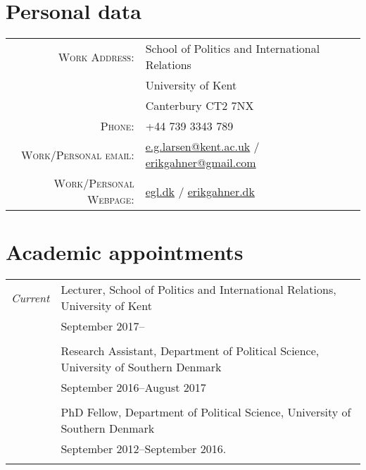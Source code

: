 \documentclass[a4paper,10pt]{article}
\begin{document}

\par{\bigskip\par}

\section{Personal data}
\begin{minipage}{0.4\textwidth}
\begin{tabular}{rl}
\textsc{Work Address:} & School of Politics and International Relations \\
& University of Kent \\
& Canterbury CT2 7NX \\
\textsc{Phone:} & +44 739 3343 789\\
\textsc{Work/Personal email:} & \href{mailto:e.g.larsen@kent.ac.uk}{e.g.larsen@kent.ac.uk} / \href{mailto:erikgahner@gmail.com}{erikgahner@gmail.com} \\
\textsc{Work/Personal Webpage:} & \href{http://egl.dk/}{egl.dk} / \href{http://erikgahner.dk/}{erikgahner.dk} \\
\end{tabular}
\end{minipage}

\vspace{.7em}
\section{Academic appointments}

\begin{tabular}{r|p{12cm}}
\emph{Current} & Lecturer, School of Politics and International Relations, University of Kent \\
 & \footnotesize{September 2017--} \\
 \multicolumn{2}{c}{} \\
& Research Assistant, Department of Political Science, University of Southern Denmark \\
& \footnotesize{September 2016--August 2017} \\
\multicolumn{2}{c}{} \\
 & PhD Fellow, Department of Political Science, University of Southern Denmark \\
& \footnotesize{September 2012--September 2016.} \\
\multicolumn{2}{c}{} \\

\end{tabular}
\end{document}
